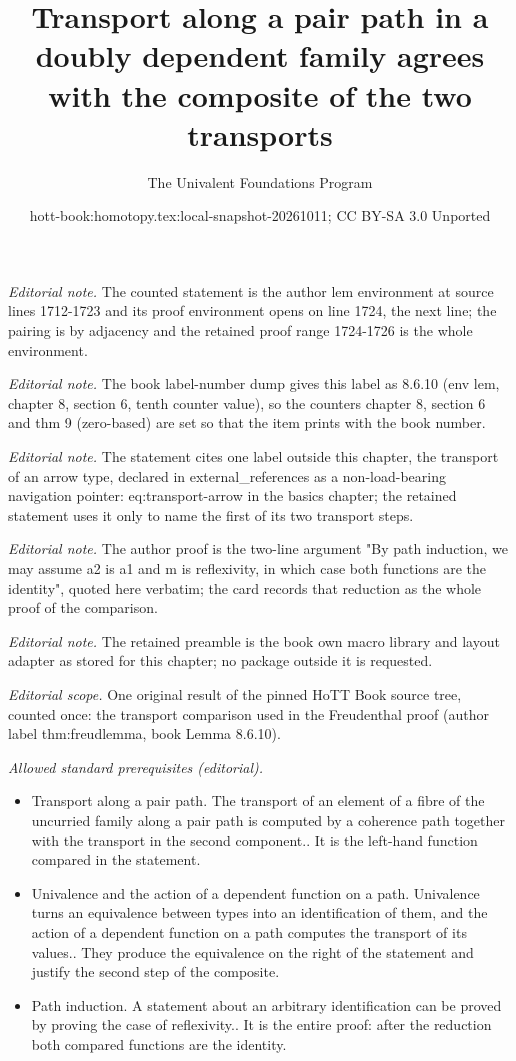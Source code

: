 \documentclass[10pt,a4paper]{article}
\title{Transport along a pair path in a doubly dependent family agrees with the composite of the two transports}
\author{The Univalent Foundations Program}
\date{hott-book:homotopy.tex:local-snapshot-20261011; CC BY-SA 3.0 Unported}
\newcounter{chapter}
\theoremstyle{definition}
\theoremstyle{remark}
\numberwithin{equation}{section}
\begin{document}
\maketitle
\setcounter{chapter}{8}
\setcounter{section}{6}
\setcounter{thm}{9}
\noindent\textit{Editorial note.} The counted statement is the author lem environment at source lines 1712-1723 and its proof environment opens on line 1724, the next line; the pairing is by adjacency and the retained proof range 1724-1726 is the whole environment.\par\medskip
\noindent\textit{Editorial note.} The book label-number dump gives this label as 8.6.10 (env lem, chapter 8, section 6, tenth counter value), so the counters chapter 8, section 6 and thm 9 (zero-based) are set so that the item prints with the book number.\par\medskip
\noindent\textit{Editorial note.} The statement cites one label outside this chapter, the transport of an arrow type, declared in external\_references as a non-load-bearing navigation pointer: eq:transport-arrow in the basics chapter; the retained statement uses it only to name the first of its two transport steps.\par\medskip
\noindent\textit{Editorial note.} The author proof is the two-line argument "By path induction, we may assume a2 is a1 and m is reflexivity, in which case both functions are the identity", quoted here verbatim; the card records that reduction as the whole proof of the comparison.\par\medskip
\noindent\textit{Editorial note.} The retained preamble is the book own macro library and layout adapter as stored for this chapter; no package outside it is requested.\par\medskip
\noindent\textit{Editorial scope.} One original result of the pinned HoTT Book source tree, counted once: the transport comparison used in the Freudenthal proof (author label thm:freudlemma, book Lemma 8.6.10).\par\medskip
\noindent\textit{Allowed standard prerequisites (editorial).}\begin{itemize}
\item Transport along a pair path. The transport of an element of a fibre of the uncurried family along a pair path is computed by a coherence path together with the transport in the second component.. It is the left-hand function compared in the statement.
\item Univalence and the action of a dependent function on a path. Univalence turns an equivalence between types into an identification of them, and the action of a dependent function on a path computes the transport of its values.. They produce the equivalence on the right of the statement and justify the second step of the composite.
\item Path induction. A statement about an arbitrary identification can be proved by proving the case of reflexivity.. It is the entire proof: after the reduction both compared functions are the identity.
\end{itemize}\medskip
\end{document}
